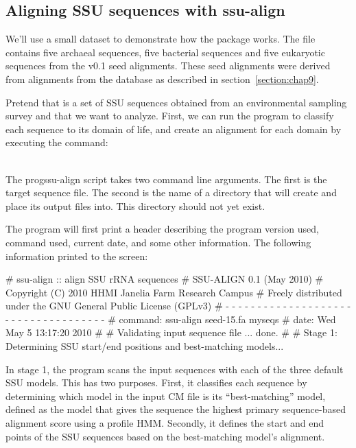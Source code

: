 \subsection{Aligning SSU sequences with ssu-align}

We'll use a small dataset to demonstrate how the package works.
The file  contains five archaeal sequences, five
bacterial sequences and five eukaryotic sequences from the
 v0.1 seed alignments. These seed alignments
were derived from alignments from the  database
\cite{CannoneGutell02} as described in section~\ref{section:chap9}.

Pretend that  is a set of SSU sequences obtained from
an environmental sampling survey and that we want to analyze. First,
we can run the  program to classify each sequence to
its domain of life, and create an alignment for each domain by
executing the command:

\\

The prog{ssu-align} script takes two command line
arguments. The first is the target sequence file. The second is the
name of a directory that  will create and place its
output files into. This directory should not yet exist. 

The program will first print a header describing the program version
used, command used, current date, and some other information. 
The following information printed to the screen:

\begin{sreoutput}
# ssu-align :: align SSU rRNA sequences
# SSU-ALIGN 0.1 (May 2010)
# Copyright (C) 2010 HHMI Janelia Farm Research Campus
# Freely distributed under the GNU General Public License (GPLv3)
# - - - - - - - - - - - - - - - - - - - - - - - - - - - - - - - - - - - -
# command: ssu-align seed-15.fa myseqs
# date:    Wed May  5 13:17:20 2010
#
# Validating input sequence file ... done.
#
# Stage 1: Determining SSU start/end positions and best-matching models...
\end{sreoutput}

In stage 1, the program scans the input sequences with each of the
three default SSU models. This has two purposes.  First, it classifies
each sequence by determining which model in the input CM file is its
``best-matching'' model, defined as
the model that gives the sequence the highest primary sequence-based
alignment score using a profile HMM. Secondly, it
defines the start and end points of the SSU sequences based on the
best-matching model's alignment.

